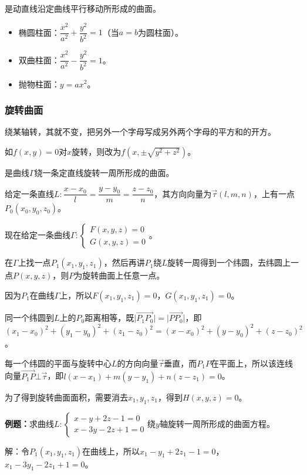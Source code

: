 \documentclass[UTF8, 12pt]{ctexart}
\begin{document}
是动直线沿定曲线平行移动所形成的曲面。

\begin{itemize}
    \item 椭圆柱面：$\dfrac{x^2}{a^2}+\dfrac{y^2}{b^2}=1$（当$a=b$为圆柱面）。
    \item 双曲柱面：$\dfrac{x^2}{a^2}-\dfrac{y^2}{b^2}=1$。
    \item 抛物柱面：$y=ax^2$。
\end{itemize}

\subsubsection{旋转曲面}

绕某轴转，其就不变，把另外一个字母写成另外两个字母的平方和的开方。

如$f(x,y)=0$对$x$旋转，则改为$f(x,\pm\sqrt{y^2+z^2})$。

是曲线$\varGamma$绕一条定直线旋转一周所形成的曲面。

给定一条直线$L:\dfrac{x-x_0}{l}=\dfrac{y-y_0}{m}=\dfrac{z-z_0}{n}$，其方向向量为$\vec{\tau}(l,m,n)$，上有一点$P_0(x_0,y_0,z_0)$。

现在给定一条曲线$\varGamma:\left\{\begin{array}{l}
    F(x,y,z)=0 \\
    G(x,y,z)=0
\end{array}\right.$。

在$\varGamma$上找一点$P_1(x_1,y_1,z_1)$，然后再讲$P_1$绕$L$旋转一周得到一个纬圆，去纬圆上一点$P(x,y,z)$，则$P$为旋转曲面上任意一点。

因为$P_1$在曲线$\varGamma$上，所以$F(x_1,y_1,z_1)=0$，$G(x_1,y_1,z_1)=0$。

同一个纬圆到$L$上的$P_0$距离相等，既$\vert\overrightarrow{P_1P_0}\vert=\vert\overrightarrow{PP_0}\vert$，即$(x_1-x_0)^2+(y_1-y_0)^2+(z_1-z_0)^2=(x-x_0)^2+(y-y_0)^2+(z-z_0)^2$。

每一个纬圆的平面与旋转中心$L$的方向向量$\vec{\tau}$垂直，而$P_1P$在平面上，所以该连线向量$\overrightarrow{P_1P}\bot\vec{\tau}$，即$l(x-x_1)+m(y-y_1)+n(z-z_1)=0$。

为了得到旋转曲面面积，需要消去$x_1,y_1,z_1$，得到$H(x,y,z)=0$。

\textbf{例题：}求曲线$L:\left\{\begin{array}{l}
    x-y+2z-1=0 \\
    x-3y-2z+1=0
\end{array}\right.$绕$y$轴旋转一周所形成的曲面方程。

解：令$P_1(x_1,y_1,z_1)$在曲线上，所以$x_1-y_1+2z_1-1=0$，$x_1-3y_1-2z_1+1=0$。
\end{document}

